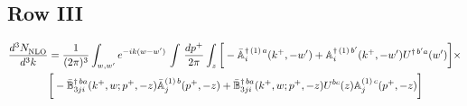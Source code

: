 \documentclass[9pt]{article}
\def\mf#1{\mathbb{#1}}
\numberwithin{equation}{section}
\begin{document}
\subsection{Row III\,}
\begin{align}
\frac{d^{3}N_{\rm NLO}^{\rm}}{d^{3}k}  & = \frac{1}{(2\pi)^{3}}  \int_{w, w^\prime} e^{-ik(w-w^\prime)}\, \int\,\frac{dp^{+}}{2\pi} \int_{z} \bigg[-\bar{\mf{A}}^{\dagger\,(1)\,a}_{i}(k^{+},-w^{\prime})+\mf{A}^{\dagger\, (1)\, b^{\prime}}_{i}(k^{+},-w^{\prime})U^{\dagger\, b^{\prime}a}(w^{\prime})\bigg]\times \notag \\ &  \bigg[-\Bar{\mf{B}}^{\dagger\, ba}_{3ji}(k^{+}, w; p^{+}, -z)\Bar{\mf{A}}^{(1)\,b}_{j}(p^{+}, - z)+ \Bar{\mf{B}}^{\dagger\, ba}_{3ji}(k^{+},w; p^{+},-z) U^{bc}(z) \mf{A}^{(1)\, c}_{j}(p^{+},- z)\bigg]\nonumber
\end{align}
\end{document}
